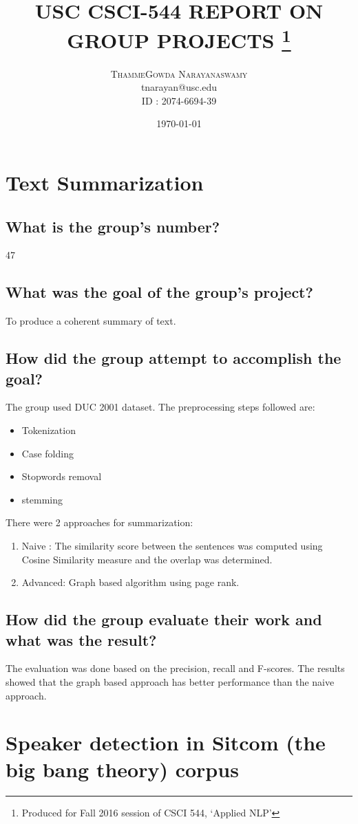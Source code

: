 \documentclass[letterpaper]{article}
\title{ \textbf{ USC CSCI-544 REPORT ON GROUP PROJECTS}  \footnote{Produced for Fall 2016 session of CSCI 544, `Applied NLP'} }
\author{\textsc{ThammeGowda Narayanaswamy} \\  tnarayan@usc.edu \\ ID : 2074-6694-39}
\date{\today}
\begin{document}
 \maketitle

\section{Text Summarization }
	\subsection{What is the group's number?}
	47
	\subsection{What was the goal of the group's project?}
	To produce a coherent summary of text.

	\subsection{How did the group attempt to accomplish the goal?}
	The group used DUC 2001 dataset. 
	The preprocessing steps followed are:
	\begin{itemize}
		\item Tokenization
		\item Case folding
		\item Stopwords removal
		\item stemming
	\end{itemize}
	There were 2 approaches for summarization:
	\begin{enumerate}
		\item Naive : The similarity score between the sentences was computed using Cosine Similarity measure and the overlap was determined.
		\item Advanced: Graph based algorithm using page rank.
\end{enumerate}

	\subsection{How did the group evaluate their work and what was the result?}
	The evaluation was done based on the precision, recall and F-scores.
	The results showed that the graph based approach has better performance than the naive approach.


\section{Speaker detection in Sitcom (the big bang theory) corpus}
\end{document}

